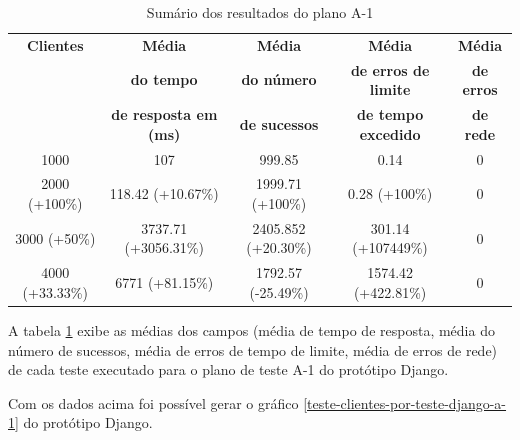   \begin{table}[H]
    \centering
    \footnotesize
    \setlength{\abovecaptionskip}{0pt}
    \setlength{\belowcaptionskip}{0pt}
    \caption[Sumário dos resultados do plano A-1]{Sumário dos resultados do plano A-1	}
    \label{tab:sumario-resultado-plano-teste-a-1}
    \begin{tabular}{c|c|c|c|c}
      \hline \hline
      \textbf{Clientes} & \textbf{Média} &	\textbf{Média} & \textbf{Média} & \textbf{Média}  \\
      {}		& \textbf{do tempo} &   \textbf{do número } & \textbf{de erros de limite} & \textbf{de erros}  \\
      {}		& \textbf{de resposta em (ms) } &\textbf{de sucessos } & \textbf{de tempo excedido} & \textbf{de rede} \\
      \hline \hline
      1000 &		107 &					999.85 & 			0.14 &					0 \\
      2000 (+100\%)&	118.42 (+10.67\%) &			1999.71 (+100\%)& 		0.28 (+100\%) &				0 \\
      3000 (+50\%)&	3737.71 (+3056.31\%)&			2405.852 (+20.30\%)& 		301.14 (+107449\%) &			0 \\
      4000 (+33.33\%)&	6771 (+81.15\%) &			1792.57 (-25.49\%)& 		1574.42 (+422.81\%) &			0 \\
      \hline \hline
    \end{tabular}
  \end{table}

  A tabela \ref{tab:sumario-resultado-plano-teste-a-1} exibe as médias dos campos (média de tempo de resposta,
  média do número de sucessos, média de erros de tempo de limite, média de erros de rede) de cada teste executado
  para o plano de teste A-1 do protótipo Django.

  Com os dados acima foi possível gerar o gráfico \ref{teste-clientes-por-teste-django-a-1} do
  protótipo Django.


